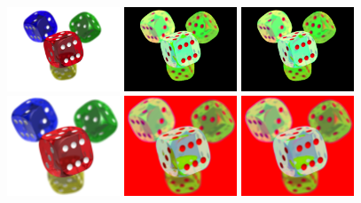 \begin{figure}[H]
    \centering

    \includegraphics[width=0.30\textwidth]{images/dice.png}
    \includegraphics[width=0.30\textwidth]{images/results/hsv-cv.dice.png}
    \includegraphics[width=0.30\textwidth]{images/results/hsv-my.dice.png}
    \\
    \includegraphics[width=0.30\textwidth]{images/dice_large.png}
    \includegraphics[width=0.30\textwidth]{images/results/hsv-cv.dice_large.png}
    \includegraphics[width=0.30\textwidth]{images/results/hsv-my.dice_large.png}

\end{figure}
